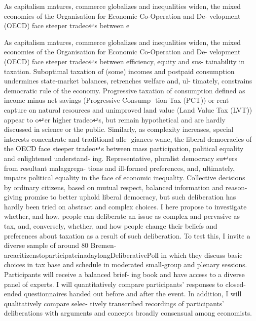 
As capitalism matures, commerce globalizes and inequalities widen, the mixed economies of the Organisation for Economic Co-Operation and De- velopment (OECD) face steeper tradeo↵s between e


As capitalism matures, commerce globalizes and inequalities widen, the mixed economies of the Organisation for Economic Co-Operation and De- velopment (OECD) face steeper tradeo↵s between efficiency, equity and sus- tainability in taxation.
Suboptimal taxation of (some) incomes and postpaid consumption undermines state-market balances, retrenches welfare and, ul- timately, constrains democratic rule of the economy.
Progressive taxation of consumption defined as income minus net savings (Progressive Consump- tion Tax (PCT)) or rent capture on natural resources and unimproved land value (Land Value Tax (LVT)) appear to o↵er higher tradeo↵s, but remain hypothetical and are hardly discussed in science or the public.
Similarly, as complexity increases, special interests concentrate and traditional alle- giances wane, the liberal democracies of the OECD face steeper tradeo↵s between mass participation, political equality and enlightened understand- ing.
Representative, pluralist democracy su↵ers from resultant malaggrega- tions and ill-formed preferences, and, ultimately, impairs political equality in the face of economic inequality.
Collective decisions by ordinary citizens, based on mutual respect, balanced information and reason-giving promise to better uphold liberal democracy, but such deliberation has hardly been tried on abstract and complex choices.
I here propose to investigate whether, and how, people can deliberate an issue as complex and pervasive as tax, and, conversely, whether, and how people change their beliefs and preferences about taxation as a result of such deliberation.
To test this, I invite a diverse sample of around 80 Bremen-areacitizenstoparticipateinadaylongDeliberativePoll in which they discuss basic choices in tax base and schedule in moderated small-group and plenary sessions.
Participants will receive a balanced brief- ing book and have access to a diverse panel of experts.
I will quantitatively compare participants’ responses to closed-ended questionnaires handed out before and after the event.
In addition, I will qualitatively compare selec- tively transcribed recordings of participants’ deliberations with arguments and concepts broadly consensual among economists.

